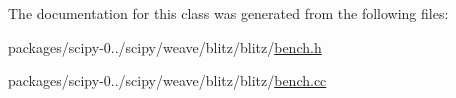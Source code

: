 The documentation for this class was generated from the following files\+:\begin{DoxyCompactItemize}
\item 
packages/scipy-\/0../scipy/weave/blitz/blitz/\hyperlink{bench_8h}{bench.\+h}\item 
packages/scipy-\/0../scipy/weave/blitz/blitz/\hyperlink{bench_8cc}{bench.\+cc}\end{DoxyCompactItemize}
